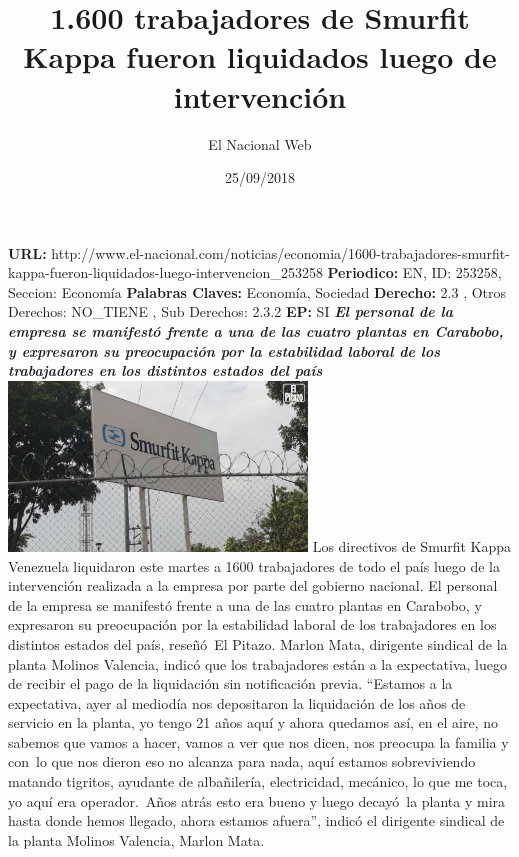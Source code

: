 \documentclass{article}%
\title{\textbf{1.600 trabajadores de Smurfit Kappa fueron liquidados luego de intervención}}%
\author{El Nacional Web}%
\date{25/09/2018}%
\begin{document}
%
\normalsize%
\maketitle%
\textbf{URL: }%
http://www.el{-}nacional.com/noticias/economia/1600{-}trabajadores{-}smurfit{-}kappa{-}fueron{-}liquidados{-}luego{-}intervencion\_253258\newline%
%
\textbf{Periodico: }%
EN, %
ID: %
253258, %
Seccion: %
Economía\newline%
%
\textbf{Palabras Claves: }%
Economía, Sociedad\newline%
%
\textbf{Derecho: }%
2.3%
, Otros Derechos: %
NO\_TIENE%
, Sub Derechos: %
2.3.2%
\newline%
%
\textbf{EP: }%
SI\newline%
\newline%
%
\textbf{\textit{El personal de la empresa se manifestó frente a una de las cuatro plantas en Carabobo, y expresaron su preocupación por la estabilidad laboral de los trabajadores en los distintos estados del país}}%
\newline%
\newline%
%
\includegraphics[width=300px]{238.jpg}%
\newline%
%
Los directivos de Smurfit Kappa Venezuela liquidaron este martes a 1600 trabajadores de todo el país luego de la intervención realizada a la empresa por parte del gobierno nacional.%
\newline%
%
El personal de la empresa se manifestó frente a una de las cuatro plantas en Carabobo, y expresaron su preocupación por la estabilidad laboral de los trabajadores en los distintos estados del país, reseñó~El Pitazo.%
\newline%
%
Marlon Mata, dirigente sindical de la planta Molinos Valencia, indicó que los trabajadores están a la expectativa, luego de recibir el pago de la liquidación sin notificación previa.%
\newline%
%
“Estamos a la expectativa, ayer al mediodía nos depositaron la liquidación de los años de servicio en la planta, yo tengo 21 años aquí y ahora quedamos así, en el aire, no sabemos que vamos a hacer, vamos a ver que nos dicen, nos preocupa la familia y con~lo que nos dieron eso no alcanza para nada, aquí estamos sobreviviendo matando tigritos, ayudante de albañilería, electricidad, mecánico, lo que me toca, yo aquí era operador.~Años atrás esto era bueno y luego decayó~la planta y mira hasta donde hemos llegado, ahora estamos afuera”, indicó el dirigente sindical de la planta Molinos Valencia, Marlon Mata.%
\end{document}
